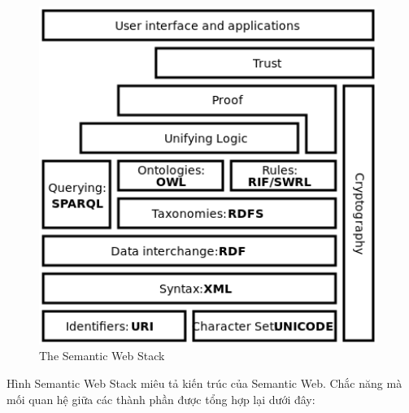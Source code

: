\begin{figure}[ht!]
	\centering
	\includegraphics[width=110mm]{Figures/semantic_web_stack.png}
	\caption{The Semantic Web Stack \label{overflow}}
\end{figure}
Hình Semantic Web Stack\cite{semantic3} miêu tả kiến trúc của Semantic Web. Chắc năng mà mối quan hệ giữa các thành phần được tổng hợp lại dưới đây:
